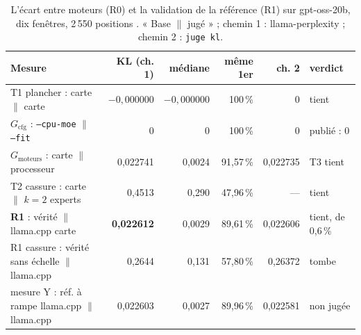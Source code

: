 \begin{table}[ht]
\centering\small
\caption[R0 et R1 sur gpt-oss-20b]{L'écart entre moteurs (R0) et la validation de la référence (R1) sur gpt-oss-20b, dix fenêtres, 2\,550 positions \mes. « Base $\|$ jugé » ; chemin 1 : llama-perplexity ; chemin 2 : \texttt{juge kl}.}
\label{tab:t2r-r0}
\begin{tabular}{@{}p{5.3cm}rrrrl@{}}
\toprule
Mesure & KL (ch. 1) & médiane & même 1er & ch. 2 & verdict \\
\midrule
T1 plancher : carte $\|$ carte & $-0{,}000000$ & $-0{,}000000$ & 100\,\% & 0 & tient \\
$G_{\text{cfg}}$ : \texttt{--cpu-moe} $\|$ \texttt{--fit} & 0 & 0 & 100\,\% & 0 & publié : 0 \\
$G_{\text{moteurs}}$ : carte $\|$ processeur & 0,022741 & 0,0024 & 91,57\,\% & 0,022735 & T3 tient \\
T2 cassure : carte $\|$ $k = 2$ experts & 0,4513 & 0,290 & 47,96\,\% & --- & tient \\
\textbf{R1} : vérité $\|$ llama.cpp carte & \textbf{0,022612} & 0,0029 & 89,61\,\% & 0,022606 & tient, de 0,6\,\% \\
R1 cassure : vérité sans échelle $\|$ llama.cpp & 0,2644 & 0,131 & 57,80\,\% & 0,26372 & tombe \\
mesure Y : réf. à rampe llama.cpp $\|$ llama.cpp & 0,022603 & 0,0027 & 89,96\,\% & 0,022581 & non jugée \\
\bottomrule
\end{tabular}
\end{table}

